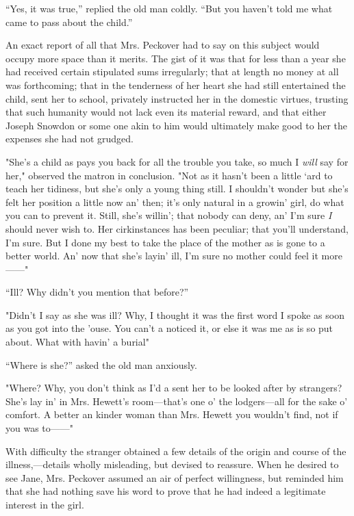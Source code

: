 ``Yes, it was true,'' replied the old man coldly. ``But you haven't told
me what came to pass about the child.''

An exact report of all that Mrs. Peckover had to say on this subject
would occupy more space than it merits. The gist of it was that for less
than a year she had received certain stipulated sums irregularly; that
at length no money at all was forthcoming; that in the tenderness of her
heart she had still entertained the child, sent her to school, privately
instructed her in the domestic virtues, trusting that such humanity
would not lack even its material reward, and that either Joseph
{}Snowdon or some one akin to him would ultimately make good to her the
expenses she had not grudged.

"She's a child as pays you back for all the trouble you take, so much I
\emph{will} say for her," observed the matron in conclusion. "Not as it
hasn't been a little `ard to teach her tidiness, but she's only a young
thing still. I shouldn't wonder but she's felt her position a little now
an' then; it's only natural in a growin' girl, do what you can to
prevent it. Still, she's willin'; that nobody can deny, an' I'm sure
\emph{I} should never wish to. Her cirkinstances has been peculiar; that
you'll understand, I'm sure. But I done my best to take the place of the
mother as is gone to a better world. An' now that she's layin' ill, I'm
sure no mother could feel it more{{------}}"

``Ill? Why didn't you mention that before?''

"Didn't I say as she was ill? Why, I thought it was the first word I
spoke as soon as you got into the 'ouse. You can't a {}noticed it, or
else it was me as is so put about. What with havin' a burial"

``Where is she?'' asked the old man anxiously.

"Where? Why, you don't think as I'd a sent her to be looked after by
strangers? She's lay in' in Mrs. Hewett's room---that's one o' the
lodgers---all for the sake o' comfort. A better an kinder woman than
Mrs. Hewett you wouldn't find, not if you was to{{------}}"

With difficulty the stranger obtained a few details of the origin and
course of the illness,---details wholly misleading, but devised to
reassure. When he desired to see Jane, Mrs. Peckover assumed an air of
perfect willingness, but reminded him that she had nothing save his word
to prove that he had indeed a legitimate interest in the girl.

